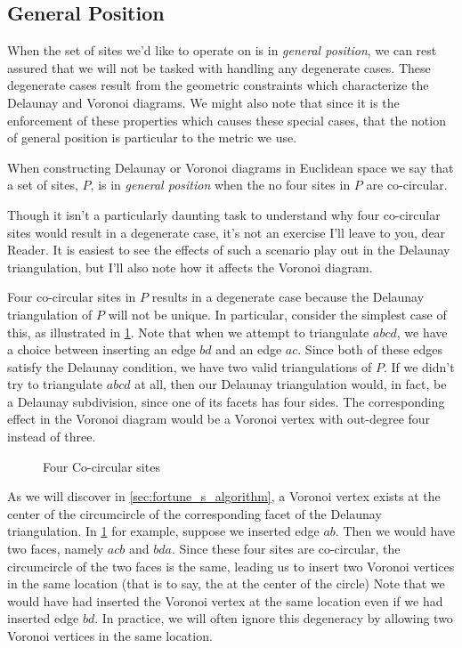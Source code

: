 \documentclass[12pt,twoside]{reedthesis}
\begin{document}
    \subsection{General Position} %
    \label{sub:general_position}
    
      When the set of sites we'd like to operate on is in \emph{general position}, we can rest assured that we will not be tasked with handling any degenerate cases. These degenerate cases result from the geometric constraints which characterize the Delaunay and Voronoi diagrams. We might also note that since it is the enforcement of these properties which causes these special cases, that the notion of general position is particular to the metric we use.\par

      When constructing Delaunay or Voronoi diagrams in Euclidean space we say that a set of sites, $P$, is in \emph{general position} when the no four sites in $P$ are co-circular.

      Though it isn't a particularly daunting task to understand why four co-circular sites would result in a degenerate case, it's not an exercise I'll leave to you, dear Reader. It is easiest to see the effects of such a scenario play out in the Delaunay triangulation, but I'll also note how it affects the Voronoi diagram. \par

      Four co-circular sites in $P$ results in a degenerate case because the Delaunay triangulation of $P$ will not be unique. In particular, consider the simplest case of this, as illustrated in \cref{fig:co_circular}. Note that when we attempt to triangulate $abcd$, we have a choice between inserting an edge $bd$ and an edge $ac$. Since both of these edges satisfy the Delaunay condition, we have two valid triangulations of $P$. If we didn't try to triangulate $abcd$ at all, then our Delaunay triangulation would, in fact, be a Delaunay subdivision, since one of its facets has four sides. The corresponding effect in the Voronoi diagram would be a Voronoi vertex with out-degree four instead of three. 

      \begin{figure}[!htb]
        \centering
        
        \caption{Four Co-circular sites}
        \label{fig:co_circular}
      \end{figure}

      As we will discover in \cref{sec:fortune_s_algorithm}, a Voronoi vertex exists at the center of the circumcircle of the corresponding facet of the Delaunay triangulation. In \cref{fig:co_circular} for example, suppose we inserted edge $ab$. Then we would have two faces, namely $acb$ and $bda$. Since these four sites are co-circular, the circumcircle of the two faces is the same, leading us to insert two Voronoi vertices in the same location (that is to say, the at the center of the circle) Note that we would have had inserted the Voronoi vertex at the same location even if we had inserted edge $bd$. In practice, we will often ignore this degeneracy by allowing two Voronoi vertices in the same location.\par
\end{document}
